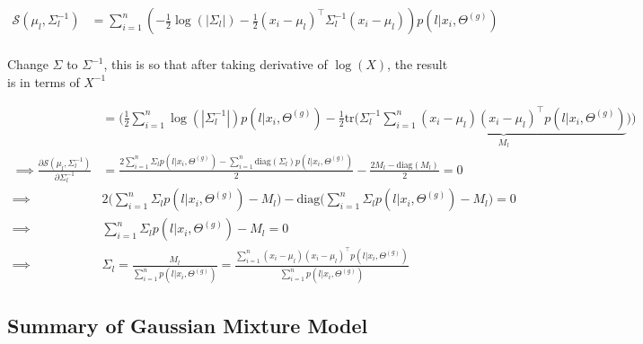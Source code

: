 \documentclass{article}
\begin{document}
\begin{equation}
\begin{split}
 \mathcal{S}(\mu_l, \Sigma_l^{-1}) &=   \sum_{i=1}^{n}   \left(  -\frac{1}{2} \log ( | \Sigma_l | )  -\frac{1}{2} ( x_i - \mu_l)^\top \Sigma_l^{-1} (x_i - \mu_l) \right)  p(l|x_i,\Theta^{(g)})\\
\end{split}
\end{equation}

Change $\Sigma$ to $\Sigma^{-1}$, this is so that after taking derivative of $\log (X) $, the result is in terms of $X^{-1}$

\begin{equation}\begin{split}
 &=    \Bigg(  \frac{1}{2} \sum_{i=1}^{n}  \log ( | \Sigma_l^{-1} | )  p(l|x_i,\Theta^{(g)})  -\frac{1}{2} \text{tr} \Bigg( \Sigma_l^{-1} \underbrace{\sum_{i=1}^{n}  ( x_i - \mu_l) (x_i - \mu_l)^\top  p(l|x_i,\Theta^{(g)}) }_{M_l} \Bigg) \Bigg) \\
\implies  \frac{\partial \mathcal{S}(\mu_l, \Sigma_l^{-1})}{\partial \Sigma^{-1}_l} &=     \frac{2   \sum_{i=1}^{n} \Sigma_l p(l|x_i,\Theta^{(g)}) -  \sum_{i=1}^{n} \text{diag}(\Sigma_l) p(l|x_i,\Theta^{(g)}) }{2}    -\frac{2M_l - \text{diag}(M_l)}{2} = 0 \\
\implies & 2 \Big(  \sum_{i=1}^{n} \Sigma_l p(l | x_i,\Theta^{(g)}) - M_l \Big)   -  \text{diag} \Big( \sum_{i=1}^{n} \Sigma_l p(l | x_i,\Theta^{(g)}) - M_l \Big)   = 0\\
\implies & \sum_{i=1}^{n} \Sigma_l p(l | x_i,\Theta^{(g)}) - M_l = 0\\
\implies & \Sigma_l = \frac{M_l}{\sum_{i=1}^{n} p(l | x_i,\Theta^{(g)})} =  \frac{\sum_{i=1}^{n}  ( x_i - \mu_l) (x_i - \mu_l)^\top p(l | x_i,\Theta^{(g)})}{ \sum_{i=1}^{n} p(l | x_i,\Theta^{(g)})}
\end{split}\end{equation}








\subsection{Summary of Gaussian Mixture Model}
\end{document}
